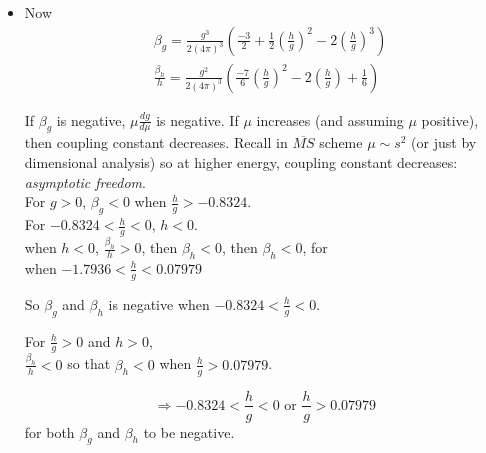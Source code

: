\documentclass[twoside]{amsart}
\begin{document}
\begin{itemize}
\[\begin{aligned}
  \frac{ \partial H_1}{ \partial g} & = \frac{1}{(4\pi)^3 } \left( - h + \frac{g}{6} \right)
\end{aligned}
\]
\[
\Longrightarrow \boxed{ \begin{aligned} & \beta_g = \frac{g}{2} \left( \frac{1}{(4\pi)^3} \right) \left( \frac{-3g^2}{2} + \frac{h^3}{g} - \frac{3h^3}{g} + \frac{h^2}{2} \right) = \frac{g}{2 (4\pi)^3} \left( \frac{-3g^2}{2} + \frac{ -2h^3}{g} + \frac{h^2}{2} \right)  \\ 
    & \beta_h = \frac{h}{2} \frac{1}{(4\pi)^3} \left( -gh + \frac{g^2}{6}  - \frac{7h^2}{6} -gh \right) = \frac{h}{2} \frac{1}{(4\pi)^3} \left( \frac{-7h^2}{6} - 2gh + \frac{g^2}{6} \right) 
\end{aligned} }
\]
\item[(d)] Now
\[
\begin{aligned}
  & \beta_g = \frac{g^3}{ 2(4\pi)^3} \left( \frac{-3}{2} + \frac{1}{2} \left( \frac{h}{g} \right)^2 - 2\left( \frac{h}{g} \right)^3 \right) \\ 
  & \frac{\beta_h}{h}  = \frac{g^2}{2(4 \pi)^3}  \left( \frac{-7}{6} \left( \frac{h}{g} \right)^2 - 2\left( \frac{h}{g} \right) + \frac{1}{6} \right) 
\end{aligned}
\]

If $\beta_g$ is negative, $\mu \frac{dg}{d\mu}$ is negative.  If $\mu$ increases (and assuming $\mu$ positive), then coupling constant decreases.  Recall in $\overline{MS}$ scheme $\mu \sim s^2$ (or just by dimensional analysis) so at higher energy, coupling constant decreases: \emph{asymptotic freedom}.   \\

\noindent For $g >0$, $\beta_g < 0$ when $\frac{h}{g} > -0.8324$.  \\
\phantom{For $g$ } For $-0.8324 < \frac{h}{g} < 0$, $h<0$.  \\
\phantom{For $g$ } \quad when $h < 0$, $\frac{\beta_h}{h} >0$, then $\beta_h < 0$, then $\beta_h <0$, for \\
\phantom{For $g$ } \quad when $-1.7936 < \frac{h}{g} < 0.07979$ 

So $\beta_g$ and $\beta_h$ is negative when $-0.8324 < \frac{h}{g} < 0$.  

For $\frac{h}{g} > 0$ and $h>0$,  \\
 $\frac{\beta_h}{h} < 0$ so that $\beta_h < 0$ when $\frac{h}{g} > 0.07979$.  

\[
\Longrightarrow \boxed{ -0.8324 < \frac{h}{g} < 0 \text{ or } \frac{h}{g} > 0.07979 } 
\]
for both $\beta_g$ and $\beta_h$ to be negative.  

\end{itemize}
\end{document}
